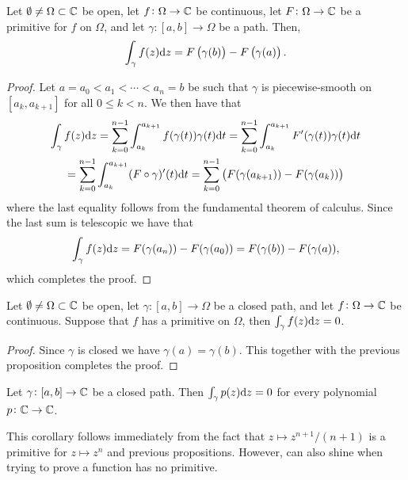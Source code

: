 \documentclass[11pt,a4paper]{article}
\begin{document}
\begin{proposition}
  Let $\emptyset \neq \Omega \subset \mathbb{C}$ be open,
  let $f \colon \Omega \to \mathbb{C}$ be continuous,
  let $F \colon \Omega \to \mathbb{C}$ be a primitive for $f$ on $\Omega$,
  and let $\gamma \colon [a, b] \to \Omega$ be a path. Then,
  \[
    \int_{\gamma} f(z) \dz =
    F\del{\gamma(b)} - F\del{\gamma(a)}.
  \]
\end{proposition}
\begin{proof}
  Let $a = a_0 < a_1 < \cdots < a_n = b$ be such that $\gamma$ is
  piecewise-smooth on $[a_k,a_{k+1}]$ for all $0 \le k < n$.
  We then have that
  \begin{multline*}
    \int_{\gamma} f(z) \dz =
    \sum_{k=0}^{n-1} \int_{a_k}^{a_{k+1}} f(\gamma(t)) \gamma(t) \dt =
    \sum_{k=0}^{n-1} \int_{a_k}^{a_{k+1}} F'(\gamma(t)) \gamma(t) \dt \\ =
    \sum_{k=0}^{n-1} \int_{a_k}^{a_{k+1}} (F \circ \gamma)'(t) \dt =
    \sum_{k=0}^{n-1} \del{F(\gamma(a_{k+1})) - F(\gamma(a_k))}
  \end{multline*}
  where the last equality follows from the fundamental theorem of calculus.
  Since the last sum is telescopic we have that
  \[
    \int_{\gamma} f(z) \mathrm{d} z =
    F(\gamma(a_{n})) - F(\gamma(a_0)) =
    F(\gamma(b)) - F(\gamma(a)),
  \]
  which completes the proof.
\end{proof}

\begin{corollary}
  \label{cor:zero-int}
  Let $\emptyset \neq \Omega \subset \mathbb{C}$ be open,
  let $\gamma \colon [a, b] \to \Omega$ be a closed path,
  and let $f \colon \Omega \to \mathbb{C}$ be continuous.
  Suppose that $f$ has a primitive on $\Omega$,
  then $\int_{\gamma} f(z) \mathrm{d} z = 0$.
\end{corollary}
\begin{proof}
  Since $\gamma$ is closed we have $\gamma(a) = \gamma(b)$.
  This together with the previous proposition completes the proof.
\end{proof}

\begin{corollary}
  \label{cor:int-of-pol-is-zero}
  Let $\gamma \colon [a, b] \to \mathbb{C}$ be a closed path.
  Then $\int_{\gamma} p(z) \mathrm{d} z = 0$ for every polynomial $p \colon \mathbb{C} \to \mathbb{C}$.
\end{corollary}

\begin{remark}
This corollary follows immediately from the fact that
$z \mapsto z^{n+1} / (n+1)$ is a primitive for $z \mapsto z^n$ and previous
propositions.
However,  can also shine when trying to prove a function
has no primitive.
\end{remark}
\end{document}
